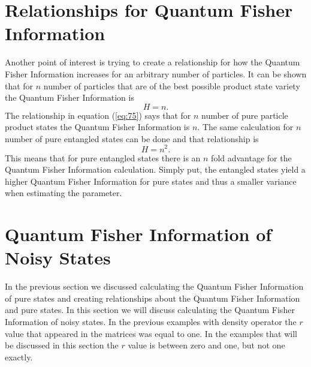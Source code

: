 \documentclass[twocolumn]{article}
\begin{document}
\section*{Relationships for Quantum Fisher Information}
Another point of interest is trying to create a relationship for how the Quantum Fisher Information increases for an arbitrary number of particles. It can be shown that for $n$ number of particles that are of the best possible product state variety the Quantum Fisher Information is
\begin{equation} \label{eq:75}
H=n.
\end{equation}
The relationship in equation (\ref{eq:75}) says that for $n$ number of pure particle product states the Quantum Fisher Information is $n$. The same calculation for $n$ number of pure entangled states can be done and that relationship is
\begin{equation} \label{eq:76}
H=n^2.
\end{equation}
This means that for pure entangled states there is an $n$ fold advantage for the Quantum Fisher Information calculation. Simply put, the entangled states yield a higher Quantum Fisher Information for pure states and thus a smaller variance when estimating the parameter.
\section*{Quantum Fisher Information of Noisy States}
In the previous section we discussed calculating the Quantum Fisher Information of pure states and creating relationships about the Quantum Fisher Information and pure states. In this section we will discuss calculating the Quantum Fisher Information of noisy states. In the previous examples with density operator the $r$ value that appeared in the matrices was equal to one. In the examples that will be discussed in this section the $r$ value is between zero and one, but not one exactly.
\end{document}
